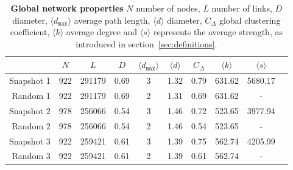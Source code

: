 \begin{table}[htbp]
\small
\centering
\caption[Global network properties]{\textbf{Global network properties} $N$ number of nodes, $L$ number of links, $D$ diameter, $\langle d_{\texttt{max}} \rangle$ average path length, $\langle d \rangle$ diameter, $C_\Delta$ global clustering coefficient, $\langle k \rangle$ average degree and $\langle s \rangle$ represents the average strength, as introduced in section~\ref{sec:definitions}.}
\label{tab:stats}
\vspace*{5mm}
\begin{tabular}{rccccccccc}
\toprule
{} &  $N$ &   $L$ &  $D$ &  $\langle d_{\texttt{max}} \rangle$ &  $\langle d \rangle$ &   $C_\Delta$ & $\langle k \rangle$ &  $\langle s \rangle$ \\
\midrule
Snapshot 1 & 922 & 291179 & 0.69 & 3 & 1.32 &  0.79 & 631.62 & 5680.17 \\
Random 1  & 922 & 291179 & 0.69 & 2 & 1.31 &  0.69 & 631.62 & - \\ \midrule
Snapshot 2 & 978 & 256066 & 0.54 & 3 & 1.46 &  0.72 & 523.65 & 3977.94 \\
Random 2  & 978 & 256066 & 0.54 & 2 & 1.46 &  0.54 & 523.65 & - \\ \midrule
Snapshot 3 & 922 & 259421 & 0.61 & 3 & 1.39 &  0.75 & 562.74 & 4205.99 \\
Random 3  & 922 & 259421 & 0.61 & 2 & 1.39 &  0.61 & 562.74 & - \\
\bottomrule
\end{tabular}
\end{table}